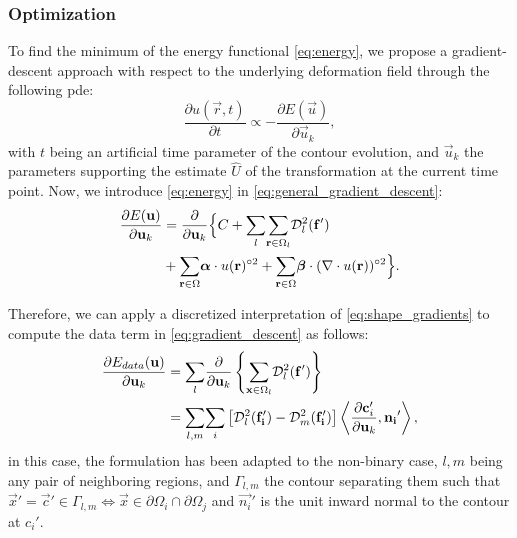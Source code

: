\subsubsection{Optimization}
\label{sec:gradient_descent}
To find the minimum of the energy functional \eqref{eq:energy},
  we propose a gradient-descent approach with respect to the underlying
  deformation field through the following \gls*{pde}:
  \begin{equation}
  \frac{\partial u(\vec{r},t)}{\partial t} \propto - \frac{\partial E(\vec{u})}{\partial \vec{u}_k},
  \label{eq:general_gradient_descent}
  \end{equation}
  with $t$ being an artificial time parameter of the contour
  evolution, and $\vec{u}_k$ the parameters supporting the estimate
  $\hat{U}$ of the transformation at the current time point.
Now, we introduce \eqref{eq:energy} in \eqref{eq:general_gradient_descent}:
  \begin{align}
  \frac{\partial E(\vec{u})}{\partial \vec{u}_k} &=
  \frac{ \partial }{\partial \vec{u}_k} \Big\{
  C + \underset{l}{\sum}
  \underset{\vec{r} \in \Omega_l}{\sum} \mdist{f'}{l} \notag\\
  &+ \underset{\vec{r} \in \Omega}{\sum} \boldsymbol{\alpha} \cdot u(\vec{r})^{\circ2}
  + \underset{\vec{r} \in \Omega}{\sum} \boldsymbol{\beta} \cdot (\nabla \cdot u(\vec{r}))^{\circ2}
  \Big\}.
  \label{eq:gradient_descent}
  \end{align}

Therefore, we can apply a discretized interpretation of \eqref{eq:shape_gradients}
  to compute the data term in \eqref{eq:gradient_descent} as follows:
  \begin{align}
  \frac{\partial E_{data}(\vec{u})}{\partial \vec{u}_k} &=
  \underset{l}{\sum} \frac{ \partial }{\partial \vec{u}_k} \left\{
   \underset{\vec{x} \in \Omega_l}{\sum} \mdist{f'}{l} \right\} \notag\\
  &= \underset{l,m}{\sum} \underset{i}{\sum}
  \left[ \mdist{f_i'}{l} - \mdist{f_i'}{m} \right]
  \left\langle \frac{\partial \vec{c}_i'}{\partial \vec{u}_k}, \vec{n_i}'\right\rangle,
  \label{eq:gradient_wshape}
  \end{align}
  in this case, the formulation has been adapted to the non-binary case, $l,m$
  being any pair of neighboring regions, and $\Gamma_{l,m}$ the contour separating
  them such that $\vec{x}' = \vec{c}' \in\Gamma_{l,m} \iff \vec{x}\in \partial\Omega_i \cap \partial\Omega_j$
  and $\vec{n_i}'$ is the unit inward normal to the contour at $c_i'$.

